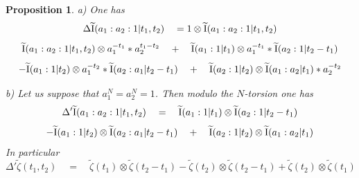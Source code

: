 \documentclass[10pt]{article}
\newtheorem{proposition}[theorem]{Proposition}
\begin{document}
 \begin{proposition} \label{ur107} a) One has 
$$
\Delta \widetilde {\rm I}(a_1:a_2:1|t_1,t_2) \quad = 1 \otimes 
\widetilde {\rm I}(a_1:a_2:1|t_1,t_2) 
$$
$$
\widetilde {\rm I}(a_1:a_2:1|t_1,t_2) \otimes a_1^{-t_1}\ast a_2^{t_1-t_2} \quad +
 \quad \widetilde {\rm I}(a_1:1|t_1) \otimes a_1^{-t_1}\ast  \widetilde {\rm I}(a_2:1|t_2-t_1)
$$
$$
-\widetilde {\rm I}(a_1:1|t_2) \otimes a_1^{-t_2} \ast \widetilde {\rm I}(a_2:a_1|t_2-t_1)
 \quad + \quad \widetilde {\rm I}(a_2:1|t_2) \otimes \widetilde 
{\rm I}(a_1:a_2|t_1)\ast   a_2^{-t_2}
$$

b) Let us suppose that $a_1^N = a_2^N = 1$. Then modulo the $N$-torsion 
one has 
$$
\Delta' \widetilde {\rm I}(a_1:a_2:1|t_1,t_2) \quad = \quad 
\widetilde {\rm I}(a_1:1|t_1) \otimes   \widetilde {\rm I}(a_2:1|t_2-t_1)
$$
$$
-\widetilde {\rm I}(a_1:1|t_2) \otimes \widetilde {\rm I}(a_2:a_1|t_2-t_1)
 \quad + \quad \widetilde {\rm I}(a_2:1|t_2) \otimes \widetilde 
{\rm I}(a_1:a_2|t_1)
$$
In particular
$$
\Delta' \widetilde \zeta(t_1,t_2) \quad = \quad \widetilde \zeta(t_1) \otimes 
\widetilde \zeta(t_2-t_1) -\widetilde \zeta(t_2) \otimes \widetilde \zeta(t_2-t_1) + \widetilde \zeta(t_2) \otimes \widetilde 
\zeta(t_1)
$$
\end{proposition} 
\end{document}
